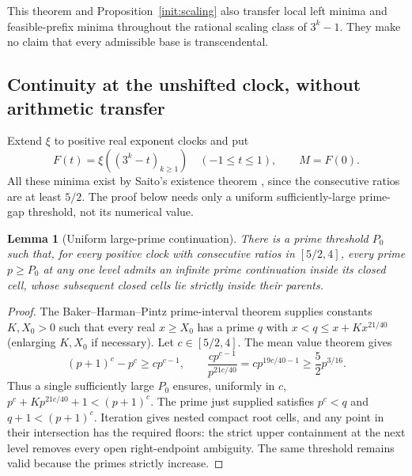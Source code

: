\documentclass[11pt,a4paper]{article}
\newtheorem{lemma}[theorem]{Lemma}\newtheorem{proposition}[theorem]{Proposition}
\theoremstyle{definition}\newtheorem{definition}[theorem]{Definition}
\theoremstyle{remark}\newtheorem{remark}[theorem]{Remark}
\begin{document}
This theorem and Proposition~\ref{init:scaling} also transfer local
left minima and feasible-prefix minima throughout the rational scaling
class of $3^k-1$. They make no claim that every admissible base is
transcendental.

\subsection{Continuity at the unshifted clock, without arithmetic transfer}
\label{sec:init-continuity}

Extend $\xi$ to positive real exponent clocks and put
\[
 F(t)=\xi((3^k-t)_{k\ge1})\quad(-1\le t\le1),\qquad
 M=F(0).
\]
All these minima exist by Saito's existence theorem
\cite[Theorem 1.3]{Saito}, since the consecutive ratios are at least
$5/2$. The proof below needs only a uniform sufficiently-large
prime-gap threshold, not its numerical value.

\begin{lemma}[Uniform large-prime continuation]\label{init:uniform-seed}
There is a prime threshold $P_0$ such that, for every positive clock
with consecutive ratios in $[5/2,4]$, every prime $p\ge P_0$ at any
one level admits an infinite prime continuation inside its closed cell,
whose subsequent closed cells lie strictly inside their parents.
\end{lemma}
\begin{proof}
The Baker--Harman--Pintz prime-interval theorem \cite{BHP} supplies
constants $K,X_0>0$ such that every real $x\ge X_0$ has a prime
$q$ with $x<q\le x+Kx^{21/40}$ (enlarging $K,X_0$ if necessary).
Let $c\in[5/2,4]$. The mean value theorem gives
\[
 (p+1)^c-p^c\ge cp^{c-1},\qquad
 \frac{cp^{c-1}}{p^{21c/40}}
 =cp^{19c/40-1}\ge\frac52p^{3/16}.
\]
Thus a single sufficiently large $P_0$ ensures, uniformly in $c$,
$p^c+Kp^{21c/40}+1<(p+1)^c$. The prime just supplied satisfies
$p^c<q$ and $q+1<(p+1)^c$. Iteration gives nested compact root
cells, and any point in their intersection has the required floors:
the strict upper containment at the next level removes every open
right-endpoint ambiguity. The same threshold remains valid because
the primes strictly increase.
\end{proof}
\end{document}
